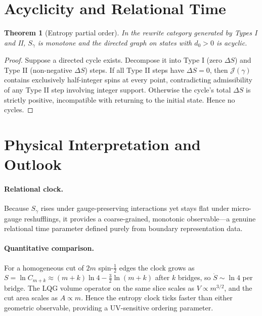 \documentclass[11pt]{article}
\newtheorem{theorem}{Theorem}[section] \newtheorem{lemma}[theorem]{Lemma} \newtheorem{definition}[theorem]{Definition} \newtheorem{corollary}[theorem]{Corollary} \newtheorem{remark}[theorem]{Remark} \newtheorem{example}[theorem]{Example}
\newcommand{\Cut}{\gamma}
\newcommand{\JS}{\mathcal{J}} %
\begin{document}

\section{Acyclicity and Relational Time}\label{sec:acyclic} \begin{theorem}[Entropy partial order]\label{thm:acyclic} In the rewrite category generated by Types I and II, $S_{\Cut}$ is monotone and the directed graph on states with $d_0>0$ is acyclic. \end{theorem} \begin{proof} Suppose a directed cycle exists. Decompose it into Type I (zero $\Delta S$) and Type II (non-negative $\Delta S$) steps. If all Type II steps have $\Delta S=0$, then $\JS(\Cut)$ contains exclusively half-integer spins at every point, contradicting admissibility of any Type II step involving integer support. Otherwise the cycle’s total $\Delta S$ is strictly positive, incompatible with returning to the initial state. Hence no cycles. \end{proof}




\section{Physical Interpretation and Outlook}\label{sec:outlook}

\paragraph{Relational clock.}

Because $S_{\Cut}$ rises under gauge-preserving interactions yet stays flat
under micro-gauge reshufflings, it provides a coarse-grained, monotonic
observable—a genuine relational time parameter defined purely from boundary
representation data.

\paragraph{Quantitative comparison.}
For a homogeneous cut of $2m$ spin-$\tfrac12$ edges the clock grows as
$S=\ln C_{m+k}\!\approx\!(m+k)\ln4-\tfrac32\!\ln(m+k)$ after $k$ bridges,
so $\dot S\!\sim\!\ln4$ per bridge.
The LQG volume operator on the same slice scales as $V\!\propto\!m^{3/2}$,
and the cut area scales as $A\!\propto\!m$.
Hence the entropy clock ticks faster than either geometric observable,
providing a UV-sensitive ordering parameter.
\end{document}
